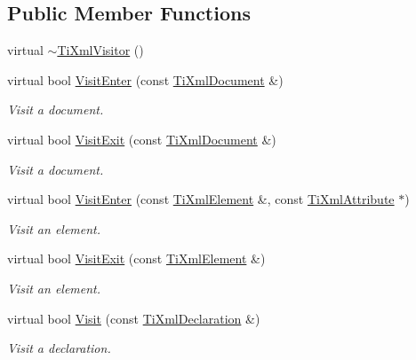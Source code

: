 \subsection*{Public Member Functions}
\begin{DoxyCompactItemize}
\item 
virtual \hyperlink{classTiXmlVisitor_a276c739ec4701f27c3f86b8ead095e5a}{$\sim$TiXmlVisitor} ()
\item 
virtual bool \hyperlink{classTiXmlVisitor_a07baecb52dd7d8716ae2a48ad0956ee0}{VisitEnter} (const \hyperlink{classTiXmlDocument}{TiXmlDocument} \&)
\begin{DoxyCompactList}\small\item\em Visit a document. \item\end{DoxyCompactList}\item 
virtual bool \hyperlink{classTiXmlVisitor_aa0ade4f27087447e93974e975c3246ad}{VisitExit} (const \hyperlink{classTiXmlDocument}{TiXmlDocument} \&)
\begin{DoxyCompactList}\small\item\em Visit a document. \item\end{DoxyCompactList}\item 
virtual bool \hyperlink{classTiXmlVisitor_af6c6178ffa517bbdba95d70490875fff}{VisitEnter} (const \hyperlink{classTiXmlElement}{TiXmlElement} \&, const \hyperlink{classTiXmlAttribute}{TiXmlAttribute} $\ast$)
\begin{DoxyCompactList}\small\item\em Visit an element. \item\end{DoxyCompactList}\item 
virtual bool \hyperlink{classTiXmlVisitor_aec2b1f8116226d52f3a1b95dafd3a32c}{VisitExit} (const \hyperlink{classTiXmlElement}{TiXmlElement} \&)
\begin{DoxyCompactList}\small\item\em Visit an element. \item\end{DoxyCompactList}\item 
virtual bool \hyperlink{classTiXmlVisitor_afad71c71ce6473fb9b4b64cd92de4a19}{Visit} (const \hyperlink{classTiXmlDeclaration}{TiXmlDeclaration} \&)
\begin{DoxyCompactList}\small\item\em Visit a declaration. \item\end{DoxyCompactList}\item 

\end{DoxyCompactItemize}

